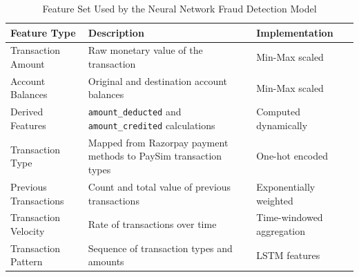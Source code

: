 \begin{table}[!htb]
\centering
\small
\begin{tabular}{|p{3.2cm}|p{7.5cm}|p{3.2cm}|}
\hline
\cellcolor{lightblue!30}\textbf{Feature Type} & \cellcolor{lightblue!30}\textbf{Description} & \cellcolor{lightblue!30}\textbf{Implementation} \\
\hline
Transaction Amount & Raw monetary value of the transaction & Min-Max scaled \\
\hline
Account Balances & Original and destination account balances & Min-Max scaled \\
\hline
Derived Features & \texttt{amount\_deducted} and \texttt{amount\_credited} calculations & Computed dynamically \\
\hline
Transaction Type & Mapped from Razorpay payment methods to PaySim transaction types & One-hot encoded \\
\hline
Previous Transactions & Count and total value of previous transactions & Exponentially weighted \\
\hline
Transaction Velocity & Rate of transactions over time & Time-windowed aggregation \\
\hline
Transaction Pattern & Sequence of transaction types and amounts & LSTM features \\
\hline
\end{tabular}
\caption{Feature Set Used by the Neural Network Fraud Detection Model}
\label{table:features}
\end{table}